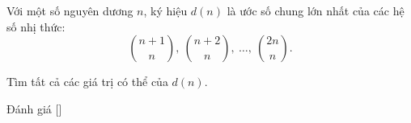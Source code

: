 \ifshowproblem
\begin{problem}\label{problem:ROM-2015-P5}
    Với một số nguyên dương \( n \), ký hiệu \( d(n) \) là ước số chung lớn nhất của các hệ số nhị thức:
    \[
        \binom{n+1}{n},\ \binom{n+2}{n},\ \ldots,\ \binom{2n}{n}.
    \]
    
    Tìm tất cả các giá trị có thể của \( d(n) \).
\end{problem}
\fi

\ifshowinfo
Đánh giá [\textbf{}]
\fi